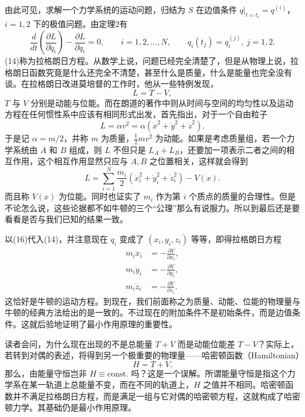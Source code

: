 由此可见，求解一个力学系统的运动问题，归结为 $S$ 在边值条件 $q|_{t=t_i}=q^{(i)}$，$i=1,2$ 下的极值问题。由定理2有
\begin{equation}
 \frac d{dt}\left(\frac{\partial L}{\partial\dot q_i}\right)
 -\frac{\partial L}{\partial q_i}=0,
 \qquad i=1,2,\ldots,N,
 \qquad q_i(t_j)=q_i^{(j)},\ j=1,2.
 \tag{14}
\end{equation}
(14)称为拉格朗日方程。从数学上说，问题已经完全清楚了，但是从物理上说，拉格朗日函数究竟是什么还完全不清楚，甚至什么是质量，什么是能量也完全没有谈。在拉格朗日改进莫培督的工作时，他从一些特例发现，
\begin{equation}
 L=T-V,
 \tag{15}
\end{equation}
$T$ 与 $V$ 分别是动能与位能。而在朗道的著作中则从时间与空间的均匀性以及运动方程在任何惯性系中应该有相同形式出发，首先指出，对于一个自由粒子
\[
 L=\alpha v^2=\alpha(\dot x^2+\dot y^2+\dot z^2).
\]
于是记 $\alpha=m/2$，并称 $m$ 为质量，$\frac12mv^2$ 为动能。如果是考虑质量组，若一个力学系统由 $A$ 和 $B$ 组成，则 $L$ 不但只是 $L_A+L_B$，还要加一项表示二者之间的相互作用，这个相互作用显然只应与 $A,B$ 之位置相关，这样就会得到
\begin{equation}
 L=\sum_{i=1}^{N}\frac{m_i}{2}(\dot x_i^2+\dot y_i^2+\dot z_i^2)-V(x).
 \tag{16}
\end{equation}
而且称 $V(x)$ 为位能。同时也证实了 $m_i$ 作为第 $i$ 个质点的质量的合理性。但是不论怎么说，这些论据都不如牛顿的三个“公理”那么有说服力。所以到最后还是要看看是否与我们已知的结果一致。

以(16)代入(14)，并注意现在 $q_i$ 变成了 $(x_i,y_i,z_i)$ 等等，即得拉格朗日方程
\begin{equation}
 \begin{aligned}
 m_i\ddot x_i&=-\frac{\partial V}{\partial x_i},\\
 m_i\ddot y_i&=-\frac{\partial V}{\partial y_i},\\
 m_i\ddot z_i&=-\frac{\partial V}{\partial z_i}.
 \end{aligned}
 \tag{17}
\end{equation}
这恰好是牛顿的运动方程。到现在，我们前面称之为质量、动能、位能的物理量与牛顿的经典方法给出的是一致的。不过现在的附加条件不是初始条件，而是边值条件。这就后验地证明了最小作用原理的重要性。

读者会问，为什么现在出现的不是总能量 $T+V$ 而是动能位能差 $T-V$？实际上，若转到对偶的表述，将得到另一个极重要的物理量——哈密顿函数（Hamiltonian）
\[
 H=T+V.
\]
那么，由能量守恒岂非 $H\equiv\mathrm{const.}$ 吗？这是一个误解。所谓能量守恒是指这个力学系在某一轨道上总能量不变，而在不同的轨道上，$H$ 之值并不相同。哈密顿函数并不满足拉格朗日方程，而是满足一组与它对偶的哈密顿方程，这就构成了哈密顿力学。其基础仍是最小作用原理。

